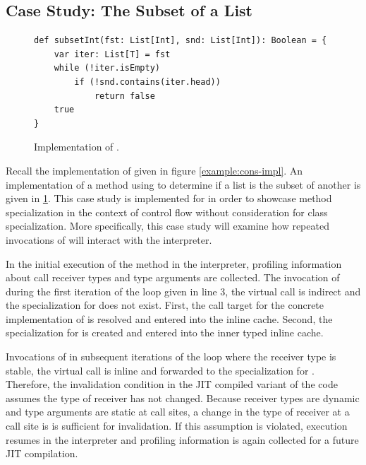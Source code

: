 \subsection{Case Study: The Subset of a List}

\begin{figure}[!htb]
\begin{verbatim}
def subsetInt(fst: List[Int], snd: List[Int]): Boolean = {
	var iter: List[T] = fst
	while (!iter.isEmpty) 
		if (!snd.contains(iter.head))
			return false 
	true
}
\end{verbatim}
\caption{Implementation of .}
\label{example:list-subset}
\end{figure}

Recall the implementation of  given in figure \ref{example:cons-impl}.
An implementation of a method using  to determine if a list is the subset of another is given in \ref{example:list-subset}.
This case study is implemented for  in order to showcase method specialization in the context of control flow without consideration for class specialization.
More specifically, this case study will examine how repeated invocations of  will interact with the interpreter.

In the initial execution of the  method in the interpreter, profiling information about call receiver types and type arguments are collected.
The invocation of  during the first iteration of the loop given in line $3$, the virtual call is indirect and the specialization for  does not exist.
First, the call target for the concrete implementation of  is resolved and entered into the inline cache.
Second, the specialization for  is created and entered into the inner typed inline cache.

Invocations of  in subsequent iterations of the loop where the receiver type is stable, the virtual call is inline and forwarded to the specialization for .
Therefore, the invalidation condition in the JIT compiled variant of the code assumes the type of receiver has not changed.
Because receiver types are dynamic and type arguments are static at call sites, a change in the type of receiver at a call site is is sufficient for invalidation.
If this assumption is violated, execution resumes in the interpreter and profiling information is again collected for a future JIT compilation.


